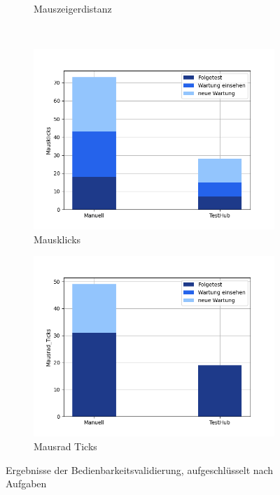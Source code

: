 \begin{figure}[H]
\begin{subfigure}{.5\textwidth}
      \caption{Mauszeigerdistanz}
    \end{subfigure}\\
    \begin{subfigure}{.5\textwidth}
        \centering
        \includegraphics[width=\linewidth]{speedtests/validierung_Mausklicks.png}
        \caption{Mausklicks}
      \end{subfigure}%
      \begin{subfigure}{.5\textwidth}
        \centering
        \includegraphics[width=\linewidth]{speedtests/validierung_Mausrad_Ticks.png}
        \caption{Mausrad Ticks}
      \end{subfigure}
    \caption{Ergebnisse der Bedienbarkeitsvalidierung, aufgeschlüsselt nach Aufgaben}
\end{figure}

